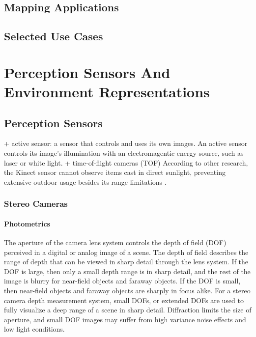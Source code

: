 \documentclass[12pt,a4paper,oneside,pdftex]{report}
\begin{document}
\section{Mapping Applications}
\label{section:mapping_applications}


\section{Selected Use Cases}
\label{section:selected_use_cases}


\chapter{Perception Sensors And Environment Representations}
\label{chapter:perception_sensors_and_environment_representations}

\section{Perception Sensors}
\label{section:perception_sensors}

+ active sensor: a sensor that controls and uses its own images. An active sensor controls its image's illumination with an electromagentic energy source, such as laser or white light.
+ time-of-flight cameras (TOF)
According to other research, the Kinect sensor cannot observe items cast in direct sunlight, preventing extensive outdoor usage besides its range limitations \cite{tikkanen13}.  

\subsection{Stereo Cameras}
\label{subsection:stereo_cameras}

\subsubsection{Photometrics}
\label{subsubsection:photometrics}

The aperture of the camera lens system controls the depth of field (DOF) perceived in a digital or analog image of a scene. The depth of field describes the range of depth that can be viewed in sharp detail through the lens system. If the DOF is large, then only a small depth range is in sharp detail, and the rest of the image is blurry for near-field objects and faraway objects. If the DOF is small, then near-field objects and faraway objects are sharply in focus alike. For a stereo camera depth measurement system, small DOFs, or extended DOFs are used to fully visualize a deep range of a scene in sharp detail. Diffraction limits the size of aperture, and small DOF images may suffer from high variance noise effects and low light conditions.
\end{document}
